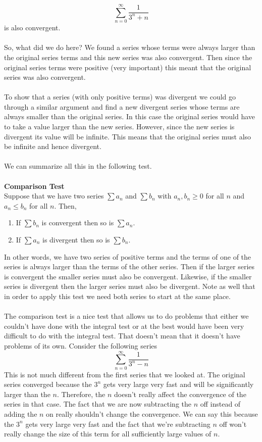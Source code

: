 \documentclass[10pt,reqno]{book}
\theoremstyle{definition}
\begin{document}
	\[ \sum\limits_{n=0}^{\infty} \frac{1}{3^n + n} \]
	is also convergent.\\ \\
	So, what did we do here? We found a series whose terms were always larger than the original series terms and this new series was also convergent. Then since the original series terms were positive (very important) this meant that the original series was also convergent.\\ \\
	To show that a series (with only positive terms) was divergent we could go through a similar argument and find a new divergent series whose terms are always smaller than the original series. In this case the original series would have to take a value larger than the new series. However, since the new series is divergent its value will be infinite. This means that the original series must also be infinite and hence divergent.\\ \\
	We can summarize all this in the following test.\\ \\
	\textbf{Comparison Test}\\
	Suppose that we have two series $ \sum a_n $ and $ \sum b_n $ with $ a_n,b_n \geq 0 $ for all $ n $ and $ a_n \leq b_n $ for all $ n $. Then,
	\begin{enumerate}
		\item If $ \sum b_n $ is convergent then so is $ \sum a_n $.
		\item If $ \sum a_n $ is divergent then so is $ \sum b_n $.
	\end{enumerate}
	In other words, we have two series of positive terms and the terms of one of the series is always larger than the terms of the other series. Then if the larger series is convergent the smaller series must also be convergent. Likewise, if the smaller series is divergent then the larger series must also be divergent. Note as well that in order to apply this test we need both series to start at the same place. \\ \\
	The comparison test is a nice test that allows us to do problems that either we couldn't have done with the integral test or at the best would have been very difficult to do with the integral test. That doesn't mean that it doesn’t have problems of its own. Consider the following series
	\[ \sum\limits_{n=0}^{\infty} \frac{1}{3^n - n} \]
	This is not much different from the first series that we looked at. The original series converged because the $ 3^n $ gets very large very fast and will be significantly larger than the $ n $. Therefore, the $ n $ doesn't really affect the convergence of the series in that case. The fact that we are now subtracting the $ n $ off instead of adding the $ n $ on really shouldn't change the convergence. We can say this because the $ 3^n $ gets very large very fast and the fact that we're subtracting $ n $ off won't really change the size of this term for all sufficiently large values of $ n $.\\ \\
\end{document}
